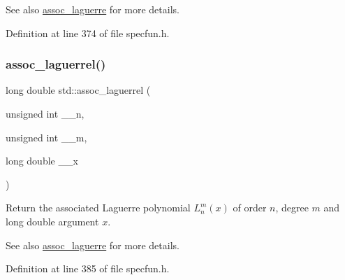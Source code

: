 \begin{DoxySeeAlso}{See also}
\hyperlink{group__tr29124__math__spec__func_ga0b33e0ac3066f2353861ce2f34b43f57}{assoc\+\_\+laguerre} for more details. 
\end{DoxySeeAlso}


Definition at line 374 of file specfun.\+h.

\mbox{\label{group__tr29124__math__spec__func_gac8e245671fb2df5de5fd978d03081f6c}} 
\subsubsection{\texorpdfstring{assoc\+\_\+laguerrel()}{assoc\_laguerrel()}}
{\footnotesize\ttfamily long double std\+::assoc\+\_\+laguerrel (\begin{DoxyParamCaption}\item[{unsigned int}]{\+\_\+\+\_\+n,  }\item[{unsigned int}]{\+\_\+\+\_\+m,  }\item[{long double}]{\+\_\+\+\_\+x }\end{DoxyParamCaption})\hspace{0.3cm}{\ttfamily [inline]}}

Return the associated Laguerre polynomial $ L_n^m(x) $ of order $ n $, degree $ m $ and {\ttfamily long double} argument $ x $.

\begin{DoxySeeAlso}{See also}
\hyperlink{group__tr29124__math__spec__func_ga0b33e0ac3066f2353861ce2f34b43f57}{assoc\+\_\+laguerre} for more details. 
\end{DoxySeeAlso}


Definition at line 385 of file specfun.\+h.

\mbox{\label{group__tr29124__math__spec__func_ga7aa4182446f687094b12688078517d53}} 
